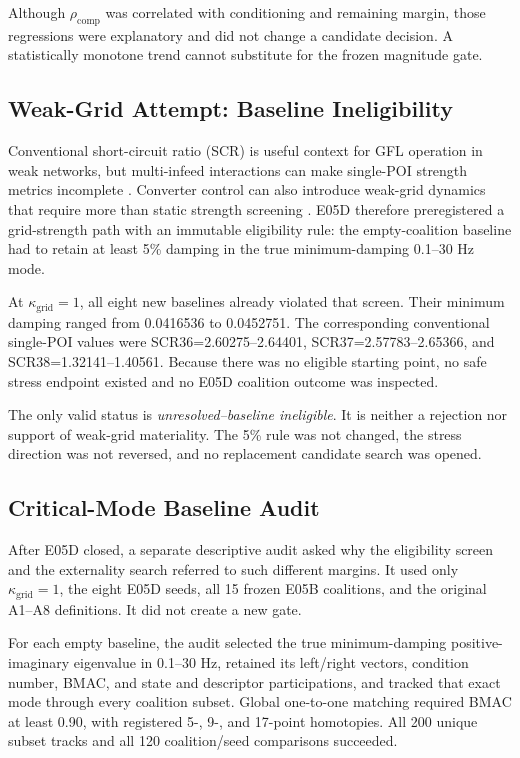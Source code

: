 Although $\rho_{\mathrm{comp}}$ was correlated with conditioning and
remaining margin, those regressions were explanatory and did not change a
candidate decision. A statistically monotone trend cannot substitute for the
frozen magnitude gate.

\subsection{Weak-Grid Attempt: Baseline Ineligibility}

Conventional short-circuit ratio (SCR) is useful context for GFL operation in
weak networks, but multi-infeed interactions can make single-POI strength
metrics incomplete \cite{xin2016gscr,nerc2017lowstrength}. Converter control
can also introduce weak-grid dynamics that require more than static strength
screening \cite{fan2019type4}. E05D therefore preregistered a grid-strength
path with an immutable eligibility rule: the empty-coalition baseline had to
retain at least 5\% damping in the true minimum-damping 0.1--30 Hz mode.

At $\kappa_{\mathrm{grid}}=1$, all eight new baselines already violated that
screen. Their minimum damping ranged from 0.0416536 to 0.0452751. The
corresponding conventional single-POI values were
SCR36=2.60275--2.64401, SCR37=2.57783--2.65366, and
SCR38=1.32141--1.40561. Because there was no eligible starting point, no safe
stress endpoint existed and no E05D coalition outcome was inspected.

The only valid status is \emph{unresolved--baseline ineligible}. It is neither
a rejection nor support of weak-grid materiality. The 5\% rule was not
changed, the stress direction was not reversed, and no replacement candidate
search was opened.

\subsection{Critical-Mode Baseline Audit}

After E05D closed, a separate descriptive audit asked why the eligibility
screen and the externality search referred to such different margins. It used
only $\kappa_{\mathrm{grid}}=1$, the eight E05D seeds, all 15 frozen E05B
coalitions, and the original A1--A8 definitions. It did not create a new gate.

For each empty baseline, the audit selected the true minimum-damping
positive-imaginary eigenvalue in 0.1--30 Hz, retained its left/right vectors,
condition number, BMAC, and state and descriptor participations, and tracked
that exact mode through every coalition subset. Global one-to-one matching
required BMAC at least 0.90, with registered 5-, 9-, and 17-point homotopies.
All 200 unique subset tracks and all 120 coalition/seed comparisons succeeded.

